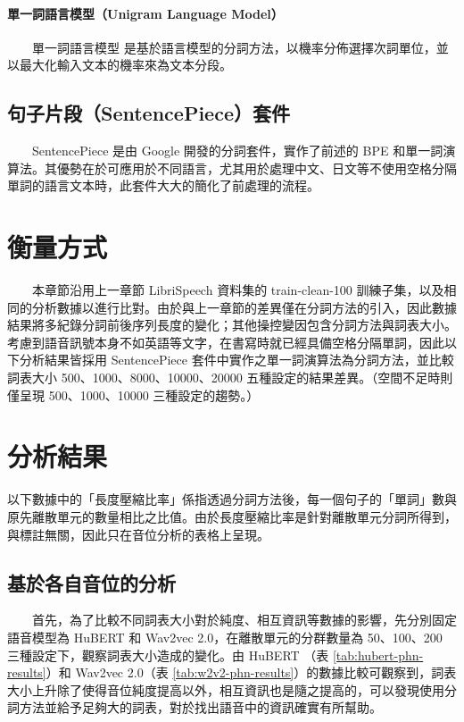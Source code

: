 \paragraph{單一詞語言模型（Unigram Language Model）}
\hfill \break
　　單一詞語言模型 \cite{kudo2018subword} 是基於語言模型的分詞方法，以機率分佈選擇次詞單位，並以最大化輸入文本的機率來為文本分段。

\subsection{句子片段（SentencePiece）套件}

　　SentencePiece \cite{kudo_sentencepiece_2018}
是由 Google 開發的分詞套件，實作了前述的 BPE 和單一詞演算法。其優勢在於可應用於不同語言，尤其用於處理中文、日文等不使用空格分隔單詞的語言文本時，此套件大大的簡化了前處理的流程。

\section{衡量方式}

　　本章節沿用上一章節 LibriSpeech 資料集的 train-clean-100 訓練子集，以及相同的分析數據以進行比對。由於與上一章節的差異僅在分詞方法的引入，因此數據結果將多紀錄分詞前後序列長度的變化；其他操控變因包含分詞方法與詞表大小。考慮到語音訊號本身不如英語等文字，在書寫時就已經具備空格分隔單詞，因此以下分析結果皆採用 SentencePiece 套件中實作之單一詞演算法為分詞方法，並比較詞表大小 500、1000、8000、10000、20000 五種設定的結果差異。（空間不足時則僅呈現 500、1000、10000 三種設定的趨勢。）

\renewcommand{\arraystretch}{0.7} %
\newcommand{\jefftablesep}{\vspace{0.5cm}}

\section{分析結果}

    以下數據中的「長度壓縮比率」係指透過分詞方法後，每一個句子的「單詞」數與原先離散單元的數量相比之比值。由於長度壓縮比率是針對離散單元分詞所得到，與標註無關，因此只在音位分析的表格上呈現。

\subsection{基於各自音位的分析}

　　首先，為了比較不同詞表大小對於純度、相互資訊等數據的影響，先分別固定語音模型為 HuBERT 和 Wav2vec 2.0，在離散單元的分群數量為 50、100、200 三種設定下，觀察詞表大小造成的變化。由 HuBERT （表 \ref{tab:hubert-phn-results}）和 Wav2vec 2.0（表 \ref{tab:w2v2-phn-results}）的數據比較可觀察到，詞表大小上升除了使得音位純度提高以外，相互資訊也是隨之提高的，可以發現使用分詞方法並給予足夠大的詞表，對於找出語音中的資訊確實有所幫助。

